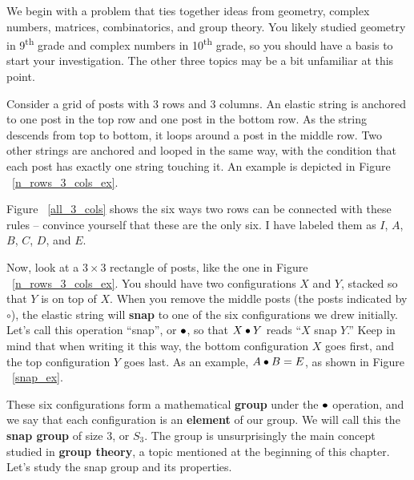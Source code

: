 \documentclass[../gatm.tex]{subfiles}
\begin{document}

\noindent We begin with a problem that ties together ideas from geometry, complex numbers, matrices, combinatorics, and group theory. You likely studied geometry in 9\textsuperscript{th} grade and complex numbers in 10\textsuperscript{th} grade, so you should have a basis to start your investigation. The other three topics may be a bit unfamiliar at this point.

Consider a grid of posts with $3$ rows and $3$ columns. An elastic string is anchored to one post in the top row and one post in the bottom row. As the string descends from top to bottom, it loops around a post in the middle row. Two other strings are anchored and looped in the same way, with the condition that each post has exactly one string touching it. An example is depicted in Figure ~\ref{n_rows_3_cols_ex}.

Figure ~\ref{all_3_cols} shows the six ways two rows can be connected with these rules -- convince yourself that these are the only six. I have labeled them as $I$, $A$, $B$, $C$, $D$, and $E$.



Now, look at a $3\times 3$ rectangle of posts, like the one in Figure ~\ref{n_rows_3_cols_ex}. You should have two configurations $X$ and $Y$, stacked so that $Y$ is on top of $X$. When you remove the middle posts (the posts indicated by $\circ$), the elastic string will \textbf{snap} to one of the six configurations we drew initially. Let's call this operation ``snap'', or $\bullet$, so that $X\bullet Y$ reads ``$X$ snap $Y$.'' Keep in mind that when writing it this way, the bottom configuration $X$ goes first, and the top configuration $Y$ goes last. As an example, $A\bullet B = E$, as shown in Figure ~\ref{snap_ex}.

These six configurations form a mathematical \textbf{group} under the $\bullet$ operation, and we say that each configuration is an \textbf{element} of our group. We will call this the \textbf{snap group} of size $3$, or $S_3$. The group is unsurprisingly the main concept studied in \textbf{group theory}, a topic mentioned at the beginning of this chapter. Let's study the snap group and its properties.
\end{document}
